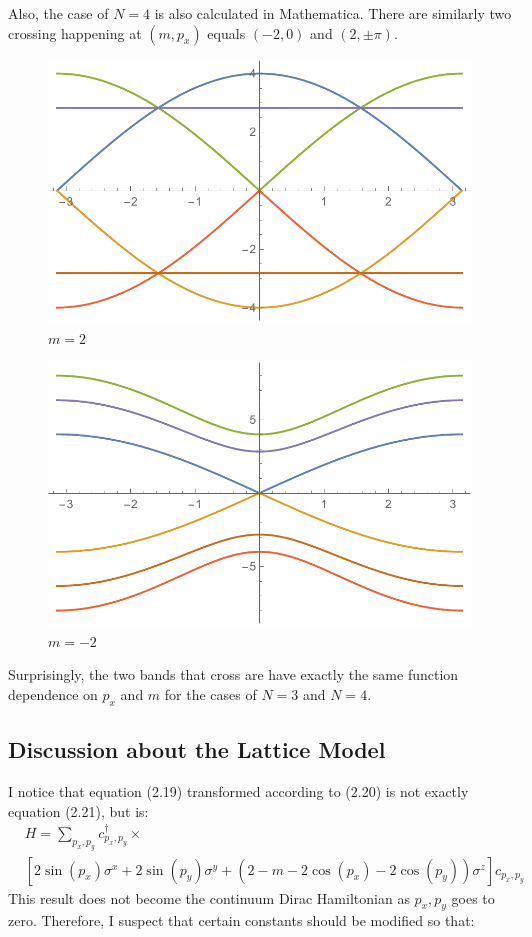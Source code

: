 \documentclass{article}
\begin{document}
    Also, the case of $N=4$ is also calculated in Mathematica.
    There are similarly two crossing happening at $(m,p_x)$ equals
    $(-2,0)$ and $(2,\pm\pi)$.

    \begin{figure}[H]
        \centering
        \includegraphics[width=0.6\linewidth]{pics/N8m2.pdf}
        \caption{$m=2$}
    \end{figure}
    \begin{figure}[H]
        \centering
        \includegraphics[width=0.6\linewidth]{pics/N8m-2.pdf}
        \caption{$m=-2$}
    \end{figure}

    Surprisingly, the two bands that cross are have exactly the same
    function dependence on $p_x$ and $m$ for the cases of $N=3$ and
    $N=4$.

    \subsection{Discussion about the Lattice Model}
    \label{sec:DisAboutLatticeModel}
    I notice that equation (2.19) transformed according to (2.20)
    is not exactly equation (2.21), but is:
    \begin{align}
        &H =\sum_{p_x,p_y} c^\dagger_{p_x,p_y}\times
        \nonumber\\
        &
        \left[
            2\sin(p_x)\sigma^x + 2\sin(p_y)\sigma^y
            +(2-m-2\cos(p_x)-2\cos(p_y))\sigma^z
        \right] c_{p_x,p_y}
    \end{align}
    This result does not become the continuum Dirac Hamiltonian as
    $p_x,p_y$ goes to zero. Therefore, I suspect that certain
    constants should be modified so that:
\end{document}
